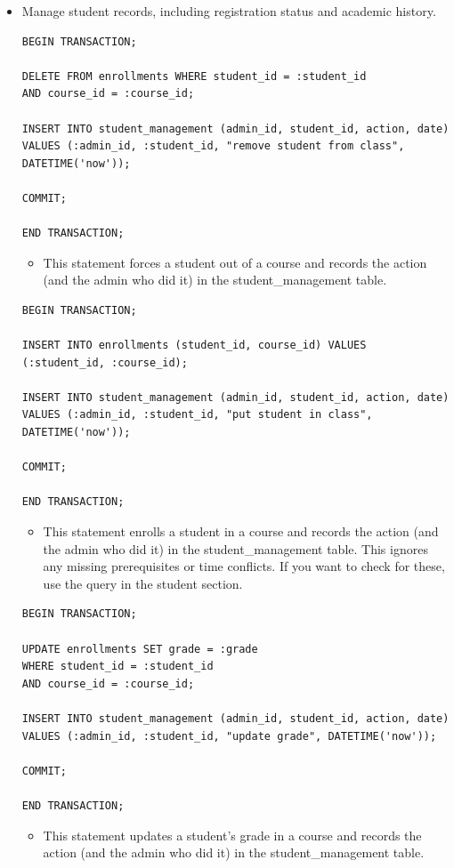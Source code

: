 \documentclass{report}
\begin{document}
\begin{itemize}
    \pagebreak
    
    \item Manage student records, including registration status and academic history.
    \begin{lstlisting}
BEGIN TRANSACTION;

DELETE FROM enrollments WHERE student_id = :student_id
AND course_id = :course_id;

INSERT INTO student_management (admin_id, student_id, action, date)
VALUES (:admin_id, :student_id, "remove student from class", DATETIME('now'));

COMMIT;

END TRANSACTION;
    \end{lstlisting}
    \begin{itemize}
        \item This statement forces a student out of a course and records the action (and the admin who did it) in the student\_management table.
    \end{itemize}
    \begin{lstlisting}
BEGIN TRANSACTION;

INSERT INTO enrollments (student_id, course_id) VALUES (:student_id, :course_id);

INSERT INTO student_management (admin_id, student_id, action, date)
VALUES (:admin_id, :student_id, "put student in class", DATETIME('now'));

COMMIT;

END TRANSACTION;
    \end{lstlisting}
    \begin{itemize}
        \item This statement enrolls a student in a course and records the action (and the admin who did it) in the student\_management table. This ignores any missing prerequisites or time conflicts. If you want to check for these, use the query in the student section.
    \end{itemize}
    \begin{lstlisting}
BEGIN TRANSACTION;

UPDATE enrollments SET grade = :grade
WHERE student_id = :student_id
AND course_id = :course_id;

INSERT INTO student_management (admin_id, student_id, action, date)
VALUES (:admin_id, :student_id, "update grade", DATETIME('now'));

COMMIT;

END TRANSACTION;
    \end{lstlisting}
    \begin{itemize}
        \item This statement updates a student's grade in a course and records the action (and the admin who did it) in the student\_management table.
    \end{itemize}
    

\end{itemize}
\end{document}
